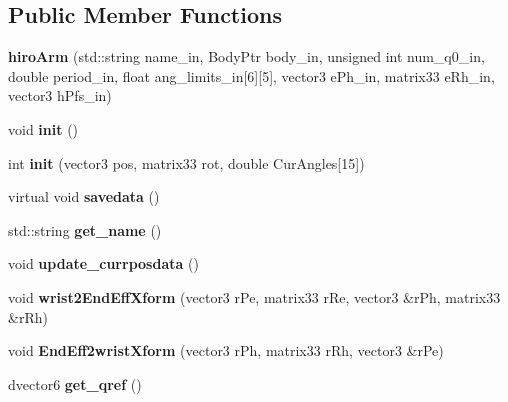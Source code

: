 \subsection*{Public Member Functions}
\begin{DoxyCompactItemize}
\item 
\hypertarget{classhiroArm_a8e4aa1fa1e81ce07ee78c00b63c1bd54}{{\bfseries hiro\-Arm} (std\-::string name\-\_\-in, Body\-Ptr body\-\_\-in, unsigned int num\-\_\-q0\-\_\-in, double period\-\_\-in, float ang\-\_\-limits\-\_\-in\mbox{[}6\mbox{]}\mbox{[}5\mbox{]}, vector3 e\-Ph\-\_\-in, matrix33 e\-Rh\-\_\-in, vector3 h\-Pfs\-\_\-in)}\label{classhiroArm_a8e4aa1fa1e81ce07ee78c00b63c1bd54}

\item 
\hypertarget{classhiroArm_a2022d79b77c7e9d7c6c6b5418c450f66}{void {\bfseries init} ()}\label{classhiroArm_a2022d79b77c7e9d7c6c6b5418c450f66}

\item 
\hypertarget{classhiroArm_ab4818ca8441e606c3de5a1042c1a7452}{int {\bfseries init} (vector3 pos, matrix33 rot, double Cur\-Angles\mbox{[}15\mbox{]})}\label{classhiroArm_ab4818ca8441e606c3de5a1042c1a7452}

\item 
\hypertarget{classhiroArm_afa4bdab3188a17b39a9b943f22906eda}{virtual void {\bfseries savedata} ()}\label{classhiroArm_afa4bdab3188a17b39a9b943f22906eda}

\item 
\hypertarget{classhiroArm_a872988ae2b0ae8691c22c9eb8f7edb71}{std\-::string {\bfseries get\-\_\-name} ()}\label{classhiroArm_a872988ae2b0ae8691c22c9eb8f7edb71}

\item 
\hypertarget{classhiroArm_a9c17f63feaa2e08fd3ee0c8a7c1f8695}{void {\bfseries update\-\_\-currposdata} ()}\label{classhiroArm_a9c17f63feaa2e08fd3ee0c8a7c1f8695}

\item 
\hypertarget{classhiroArm_a2a6fff95ed7880b00f6fde6f587e1567}{void {\bfseries wrist2\-End\-Eff\-Xform} (vector3 r\-Pe, matrix33 r\-Re, vector3 \&r\-Ph, matrix33 \&r\-Rh)}\label{classhiroArm_a2a6fff95ed7880b00f6fde6f587e1567}

\item 
\hypertarget{classhiroArm_af30f07bdc11e6ead92e16ecc05fa01ae}{void {\bfseries End\-Eff2wrist\-Xform} (vector3 r\-Ph, matrix33 r\-Rh, vector3 \&r\-Pe)}\label{classhiroArm_af30f07bdc11e6ead92e16ecc05fa01ae}

\item 
\hypertarget{classhiroArm_a380c4809951756d76465a27925b81fb6}{dvector6 {\bfseries get\-\_\-qref} ()}\label{classhiroArm_a380c4809951756d76465a27925b81fb6}


\end{DoxyCompactItemize}
